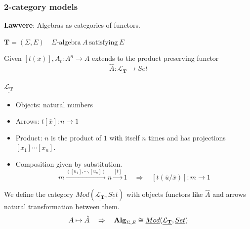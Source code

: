 \documentclass{beamer}
\begin{document}
\begin{frame}
    \frametitle{2-category models}
    \scriptsize 
    \textbf{Lawvere}: Algebras as categories of functors.
    
    $\mathbf{T} = (\Sigma,E) \quad \Sigma\text{-algebra}\ A\ \text{satisfying}\ E$

    Given  $[t(\overline{x})], A_t:A^n \rightarrow A$ extends to the product preserving functor
    $$ \hat{A}:\underline{\mathcal{L}_\mathbf{T}} \rightarrow \underline{Set}$$

    $\underline{\mathcal{L}_\mathbf{T}}$
    \begin{itemize}
        \item Objects: natural numbers 
        \item Arrows: $t[\overline{x}]: n \rightarrow 1$
        \item Product: $n$ is the product of $1$ with itself $n$ times and has projections $[x_1] \cdots [x_n]$.
        \item Composition given by substitution. 
         $$ m \xrightarrow{([u_1],\cdots,[u_n])} n \xrightarrow{[t]} 1 \quad \Rightarrow\quad [t(\overline{u}/\overline{x})]:m \rightarrow 1$$ 
    \end{itemize}
    We define the category $\underline{Mod}(\underline{\mathcal{L}_\mathbf{T}},\underline{Set})$ with objects functors like $\hat{A}$ and arrows 
    natural transformation between them.
    $$A \mapsto \hat{A}\quad \Rightarrow\quad\text{\textbf{Alg}}_{\Sigma,E} \cong \underline{Mod}(\underline{\mathcal{L}_\mathbf{T}},\underline{Set})$$
\end{frame}
\end{document}
